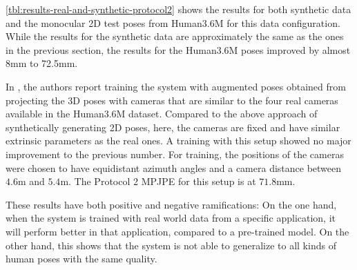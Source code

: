 

\autoref{tbl:results-real-and-synthetic-protocol2} shows the results for both synthetic data and the monocular 2D test poses from Human3.6M for this data configuration.
While the results for the synthetic data are approximately the same as the ones in the previous section, the results for the Human3.6M poses improved by almost 8mm to 72.5mm.

In \cite{drover18}, the authors report training the system with augmented poses obtained from projecting the 3D poses with cameras that are similar to the four real cameras available in the Human3.6M dataset.
Compared to the above approach of synthetically generating 2D poses, here, the cameras are fixed and have similar extrinsic parameters as the real ones.
A training with this setup showed no major improvement to the previous number.
For training, the positions of the cameras were chosen to have equidistant azimuth angles and a camera distance between $4.6$m and $5.4$m.
The Protocol 2 MPJPE for this setup is at $71.8$mm.

These results have both positive and negative ramifications:
On the one hand, when the system is trained with real world data from a specific application, it will perform better in that application, compared to a pre-trained model.
On the other hand, this shows that the system is not able to generalize to all kinds of human poses with the same quality. 
